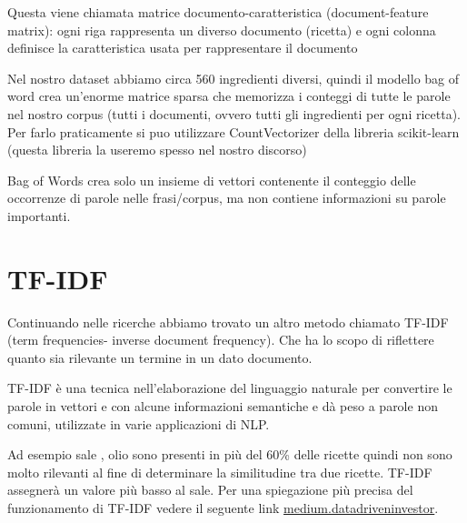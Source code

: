 \documentclass[12pt]{report}
\begin{document}
\begin{center}
\end{center}

Questa viene chiamata matrice documento-caratteristica (document-feature matrix): ogni riga rappresenta un diverso documento (ricetta) e ogni colonna definisce la caratteristica usata per rappresentare il documento

Nel nostro dataset abbiamo circa 560 ingredienti diversi, quindi il modello bag of word crea un'enorme matrice sparsa che memorizza i conteggi di tutte le parole nel nostro corpus (tutti i documenti, ovvero tutti gli ingredienti per ogni ricetta). Per farlo praticamente si puo utilizzare CountVectorizer della libreria scikit-learn (questa libreria la useremo spesso nel nostro discorso)

Bag of Words crea solo un insieme di vettori contenente il conteggio delle occorrenze di parole nelle frasi/corpus, ma non contiene informazioni su parole importanti.

\section{TF-IDF}

Continuando nelle ricerche abbiamo trovato un altro metodo chiamato TF-IDF (term frequencies- inverse document frequency). Che ha lo scopo di riflettere quanto sia rilevante un termine in un dato documento.

TF-IDF è una tecnica nell'elaborazione del linguaggio naturale per convertire le parole in vettori e con alcune informazioni semantiche e dà peso a parole non comuni, utilizzate in varie applicazioni di NLP. 

Ad esempio sale , olio sono presenti in più del 60\% delle ricette quindi non sono molto rilevanti al fine di determinare la similitudine tra due ricette. TF-IDF assegnerà un valore più basso al sale.
Per una spiegazione più precisa del funzionamento di TF-IDF vedere il seguente link \href{https://medium.datadriveninvestor.com/tf-idf-in-natural-language-processing-8db8ef4a7736}{medium.datadriveninvestor}.
\end{document}
